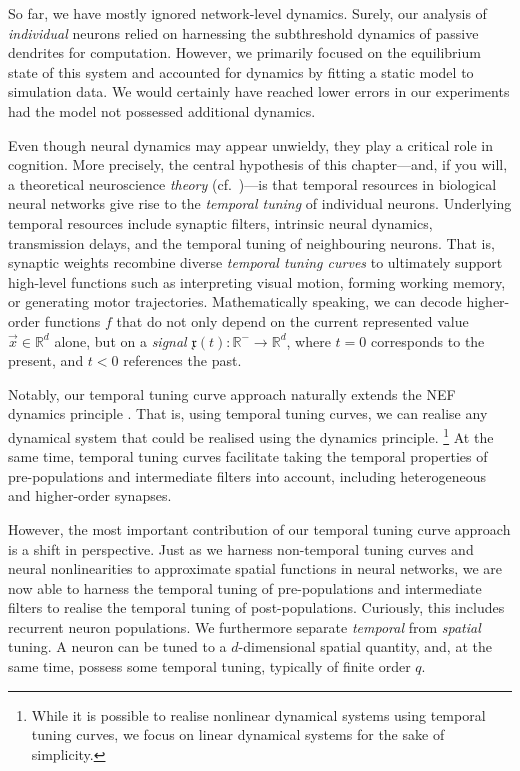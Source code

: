 
So far, we have mostly ignored network-level dynamics.
Surely, our analysis of \emph{individual} \nlif neurons relied on harnessing the subthreshold dynamics of passive dendrites for computation.
However, we primarily focused on the equilibrium state of this system and accounted for dynamics by fitting a static model to simulation data.
We would certainly have reached lower errors in our experiments had the model not possessed additional dynamics.

Even though neural dynamics may appear unwieldy, they play a critical role in cognition.
More precisely, the central hypothesis of this chapter---and, if you will, a theoretical neuroscience \emph{theory} (cf.~)---is that temporal resources in biological neural networks give rise to the \emph{temporal tuning} of individual neurons.
Underlying temporal resources include synaptic filters, intrinsic neural dynamics, transmission delays, and the temporal tuning of neighbouring neurons.
That is, synaptic weights recombine diverse \emph{temporal tuning curves} to ultimately support high-level functions such as interpreting visual motion, forming working memory, or generating motor trajectories.
Mathematically speaking, we can decode higher-order functions $f$ that do not only depend on the current represented value $\vec x \in \mathbb{R}^d$ alone, but on a \emph{signal} $\mathfrak{x}(t) : \mathbb{R}^- \longrightarrow \mathbb{R}^d$, where $t = 0$ corresponds to the present, and $t < 0$ references the past.

Notably, our temporal tuning curve approach naturally extends the NEF dynamics principle \citep[Chapter~8]{eliasmith2003neural}.
That is, using temporal tuning curves, we can realise any dynamical system that could be realised using the dynamics principle.%
\footnote{While it is possible to realise nonlinear dynamical systems using temporal tuning curves, we focus on linear dynamical systems for the sake of simplicity.}
At the same time, temporal tuning curves facilitate taking the temporal properties of pre-populations and intermediate filters into account, including heterogeneous and higher-order synapses.

However, the most important contribution of our temporal tuning curve approach is a shift in perspective.
Just as we harness non-temporal tuning curves and neural nonlinearities to approximate spatial functions in neural networks, we are now able to harness the temporal tuning of pre-populations and intermediate filters to realise the temporal tuning of post-populations.
Curiously, this includes recurrent neuron populations.
We furthermore separate \emph{temporal} from \emph{spatial} tuning.
A neuron can be tuned to a $d$-dimensional spatial quantity, and, at the same time, possess some temporal tuning, typically of finite order $q$.

